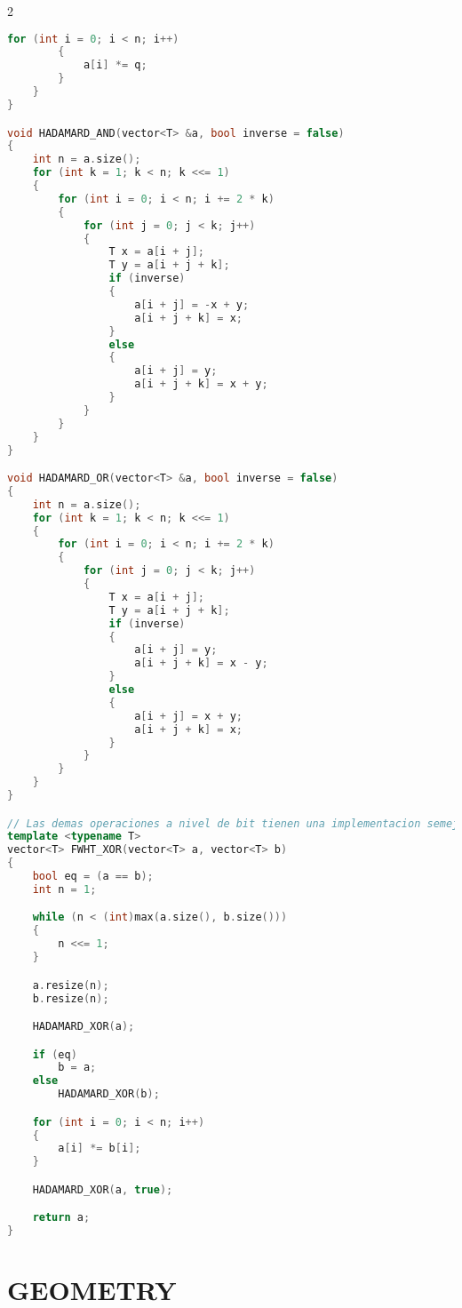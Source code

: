 \documentclass[leter]{amsart}
\begin{document}
\begin{multicols}{2}
\begin{lstlisting}[language=C++]
        for (int i = 0; i < n; i++)
        {
            a[i] *= q;
        }
    }
}

void HADAMARD_AND(vector<T> &a, bool inverse = false)
{
    int n = a.size();
    for (int k = 1; k < n; k <<= 1)
    {
        for (int i = 0; i < n; i += 2 * k)
        {
            for (int j = 0; j < k; j++)
            {
                T x = a[i + j];
                T y = a[i + j + k];
                if (inverse)
                {
                    a[i + j] = -x + y;
                    a[i + j + k] = x;
                }
                else
                {
                    a[i + j] = y;
                    a[i + j + k] = x + y;
                }
            }
        }
    }
}

void HADAMARD_OR(vector<T> &a, bool inverse = false)
{
    int n = a.size();
    for (int k = 1; k < n; k <<= 1)
    {
        for (int i = 0; i < n; i += 2 * k)
        {
            for (int j = 0; j < k; j++)
            {
                T x = a[i + j];
                T y = a[i + j + k];
                if (inverse)
                {
                    a[i + j] = y;
                    a[i + j + k] = x - y;
                }
                else
                {
                    a[i + j] = x + y;
                    a[i + j + k] = x;
                }
            }
        }
    }
}

// Las demas operaciones a nivel de bit tienen una implementacion semejante
template <typename T>
vector<T> FWHT_XOR(vector<T> a, vector<T> b)
{
    bool eq = (a == b);
    int n = 1;

    while (n < (int)max(a.size(), b.size()))
    {
        n <<= 1;
    }

    a.resize(n);
    b.resize(n);

    HADAMARD_XOR(a);

    if (eq)
        b = a;
    else
        HADAMARD_XOR(b);

    for (int i = 0; i < n; i++)
    {
        a[i] *= b[i];
    }

    HADAMARD_XOR(a, true);

    return a;
}


\end{lstlisting}
\end{multicols}
\enlargethispage*{\baselineskip}\section{GEOMETRY}
\end{document}
